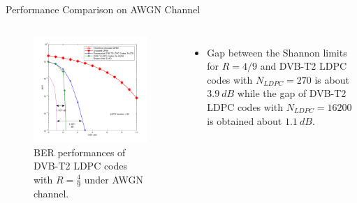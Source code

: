 \documentclass[11pt, aspectratio=169]{beamer}
\begin{document}
\begin{frame}{Performance Comparison on AWGN Channel}
\vspace{-25pt}
\begin{columns}
\begin{figure}
\centering 
\includegraphics[scale=0.4]{gambarafa/AWGN}
\caption{BER performances of DVB-T2 LDPC codes with $R=\frac{4}{9}$ under AWGN channel.}
\label{awgn} %
\end{figure}
\begin{itemize}
\item Gap between the Shannon limits for $R=4/9$ and  DVB-T2 LDPC codes with $N_{LDPC}=270$ is about $3.9~dB$ while the gap of DVB-T2 LDPC codes with $N_{LDPC}=16200$ is obtained about $1.1~dB$.
\end{itemize}
\end{columns}
\end{frame}
\end{document}
